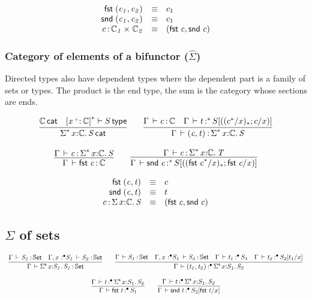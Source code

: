 \documentclass[11pt]{article}
\theoremstyle{plain}
\begin{document}
\[
\begin{array}{rcll}
\mathit{\mathsf{fst}_{} \: \mathit{(c_1,c_2)_{}}} & \equiv & c_1 \\
\mathit{\mathsf{snd}_{} \: \mathit{(c_1,c_2)_{}}} & \equiv & c_1 \\
c \, \mathit{:} \, \mathit{\mathbb{C}_1} \times_{\mathit{}} \mathit{\mathbb{C}_2} & \equiv & \mathit{(\mathit{\mathsf{fst}_{} \: c},\mathit{\mathsf{snd}_{} \: c})_{}}
\end{array}
\]

\subsubsection{Category of elements of a bifunctor ($\hat{\Sigma}$)}

Directed types also have dependent types where the dependent part is a
family of sets or types. The product is the end type, the sum is the
category whose sections are ends.

\[
\begin{array}{c}
\infer{\wfdtp{\sigmacat{\vcond}{x}{\C}{S}}}
      {\wfdtp{\C} &
        \wftp{\dupctx{\catvar{x}{\co}{\C}}{\vcond}}{S}}
\qquad
\infer{\ofdtp{\Gamma}{\pair{c}{t}}{\sigmacat{\vcond} x \C S}}
      {\ofdtp{\Gamma}{c}{\C} &
       \oftpe{\Gamma}{t}{\vcond}{\tsubst{S}{\substdup{(c^\vcond/x)}{\vcond}{c/x}}}}
\\ \\
\infer{\ofdtp{\Gamma}{\fst c}{\C}}
      {\ofdtp{\Gamma}{c}{\sigmacat{\vcond}{x}{\C}{S}}}
\qquad
\infer{\oftpe{\Gamma}{\snd c}{\vcond}{\tsubst{S}{\substdup{(\fst c^\vcond / x)}{\vcond}{\fst c/x}}}}
      {\ofdtp{\Gamma}{c}{\sigmacat{\vcond}{x}{\C}{T}}}
\end{array}
\]

\[
\begin{array}{rcll}
\mathit{\mathsf{fst}_{} \: \mathit{(c,t)_{}}} & \equiv & c \\
\mathit{\mathsf{snd}_{} \: \mathit{(c,t)_{}}} & \equiv & t \\
c \, \mathit{:} \, \textnormal{$\Sigma$}\,x \mathit{:} \mathbb{C}.\,\mathit{S} & \equiv & \mathit{(\mathit{\mathsf{fst}_{} \: c},\mathit{\mathsf{snd}_{} \: c})_{}}
\end{array}
\]

\subsection{$\Sigma$ of sets}

\[
\begin{array}{c}
\infer{\ofdtp{\Gamma}{\sigmaset{x}{S_1}{S_1}}{\types}}
      {\ofdtp{\Gamma}{S_1}{\types} &
        \ofdtp{\Gamma, \tpvar{x}{\bullet}{{S_1}}}{S_2}{\types}}
\qquad
\infer{\oftpe{\Gamma}{\pair{t_1}{t_2}}{\bullet}{\sigmaset x {S_1} {S_2}}}
      {\ofdtp{\Gamma}{S_1}{\types} &
        \ofdtp{\Gamma, \tpvar{x}{\bullet}{{S_1}}}{S_2}{\types} &
        \oftpe{\Gamma}{t_1}{\bullet}{S_1} &
        \oftpe{\Gamma}{t_2}{\bullet}{\subst{S_2}{t_1}x}}
\\ \\
\infer{\oftpe{\Gamma}{\fst t}{\bullet}{{S_1}}}
      {\oftpe{\Gamma}{t}{\bullet}{\sigmaset{x}{S_1}{S_2}}}
\qquad
\infer{\oftpe{\Gamma}{\snd t}{\bullet}{\subst{S_2}{\fst t}{x}}}
      {\oftpe{\Gamma}{t}{\bullet}{\sigmaset{x}{S_1}{S_2}}}
\end{array}
\]
\end{document}
